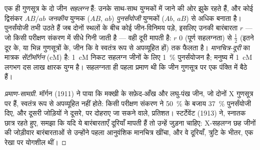 \begin{definition}[सहलग्नता और पुनर्संयोजन बारंबारता]\label{def:b2:meiosis-heredity:linkage}
एक ही गुणसूत्र के दो जीन \emph{सहलग्न} हैं: उनके 
साथ-साथ युग्मकों में जाने की ओर झुके रहते हैं, और कोई द्विसंकर
$AB/ab$ \emph{जनकीय} युग्मक ($AB$, $ab$) \emph{पुनर्संयोजी} युग्मकों
($Ab$, $aB$) से अधिक बनाता है। पुनर्संयोजी तभी उठते हैं जब दोनों स्थलों
के बीच कोई जीन-विनिमय पड़े, इसलिए उनकी बारंबारता $r$ --- जो किसी
परीक्षण संकरण में सीधे गिनी जाती है --- वही दूरी मापती है: $r$
0 (पूर्ण सहलग्नता) से $\tfrac12$ (इतने दूर के, या भिन्न गुणसूत्रों के,
जीन कि वे स्वतंत्र रूप से अपव्यूहित हों) तक फैलता है।
\emph{मानचित्र-दूरी} का मात्रक \emph{सेंटीमॉर्गन} (cM) है: \qty{1}{cM}
निकट सहलग्न जीनों के लिए \qty{1}{\%} पुनर्संयोजन है; मनुष्य में
\qty{1}{cM} लगभग दस लाख क्षारक युग्म है। सहलग्नता ही पहला प्रमाण थी कि
जीन गुणसूत्र पर एक पंक्ति में बैठे हैं।
\end{definition}
\begin{proof}[प्रमाण-सामग्री]
मॉर्गन (1911) ने पाया कि मक्खी के सफ़ेद-आँख और लघु-पंख जीन, जो दोनों
X गुणसूत्र पर हैं, स्वतंत्र रूप से अपव्यूहित नहीं होते: किसी
परीक्षण संकरण ने \qty{50}{\%} के बजाय \qty{37}{\%} पुनर्संयोजी दिए,
और दूसरी जोड़ियों ने दूसरे, पर दोहराए जा सकने वाले, प्रतिशत। स्टर्टेवेंट
(1913) ने, स्नातक छात्र रहते हुए, समझा कि यदि ये बारंबारताएँ दूरियाँ
मापती हैं तो उन्हें जुड़ना चाहिए: X-सहलग्न छह जीनों की जोड़ीवार
बारंबारताओं से उन्होंने पहला आनुवंशिक मानचित्र खींचा, और वे दूरियाँ,
त्रुटि के भीतर, एक रेखा पर योगशील थीं।
\end{proof}

